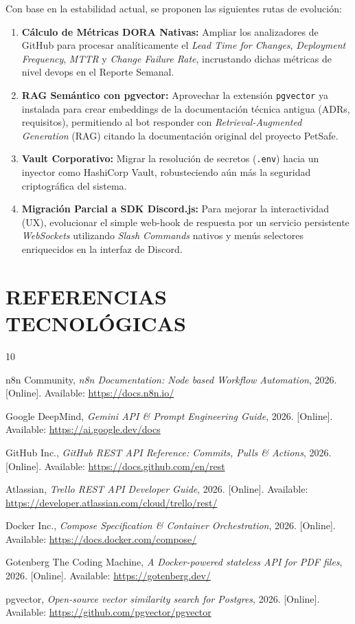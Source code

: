 \documentclass{encabezado}
\begin{document}
Con base en la estabilidad actual, se proponen las siguientes rutas de evolución:
\begin{enumerate}
    \item \textbf{Cálculo de Métricas DORA Nativas:} Ampliar los analizadores de GitHub para procesar analíticamente el \textit{Lead Time for Changes}, \textit{Deployment Frequency}, \textit{MTTR} y \textit{Change Failure Rate}, incrustando dichas métricas de nivel devops en el Reporte Semanal.
    \item \textbf{RAG Semántico con pgvector:} Aprovechar la extensión \texttt{pgvector} ya instalada para crear embeddings de la documentación técnica antigua (ADRs, requisitos), permitiendo al bot responder con \textit{Retrieval-Augmented Generation} (RAG) citando la documentación original del proyecto PetSafe.
    \item \textbf{Vault Corporativo:} Migrar la resolución de secretos (\texttt{.env}) hacia un inyector como HashiCorp Vault, robusteciendo aún más la seguridad criptográfica del sistema.
    \item \textbf{Migración Parcial a SDK Discord.js:} Para mejorar la interactividad (UX), evolucionar el simple web-hook de respuesta por un servicio persistente \textit{WebSockets} utilizando \textit{Slash Commands} nativos y menús selectores enriquecidos en la interfaz de Discord.
\end{enumerate}

\section{REFERENCIAS TECNOLÓGICAS}

\begin{thebibliography}{10}

n8n Community, \textit{n8n Documentation: Node based Workflow Automation}, 2026. [Online]. Available: \url{https://docs.n8n.io/}

Google DeepMind, \textit{Gemini API \& Prompt Engineering Guide}, 2026. [Online]. Available: \url{https://ai.google.dev/docs}

GitHub Inc., \textit{GitHub REST API Reference: Commits, Pulls \& Actions}, 2026. [Online]. Available: \url{https://docs.github.com/en/rest}

Atlassian, \textit{Trello REST API Developer Guide}, 2026. [Online]. Available: \url{https://developer.atlassian.com/cloud/trello/rest/}

Docker Inc., \textit{Compose Specification \& Container Orchestration}, 2026. [Online]. Available: \url{https://docs.docker.com/compose/}

Gotenberg The Coding Machine, \textit{A Docker-powered stateless API for PDF files}, 2026. [Online]. Available: \url{https://gotenberg.dev/}

pgvector, \textit{Open-source vector similarity search for Postgres}, 2026. [Online]. Available: \url{https://github.com/pgvector/pgvector}

\end{thebibliography}
\end{document}
